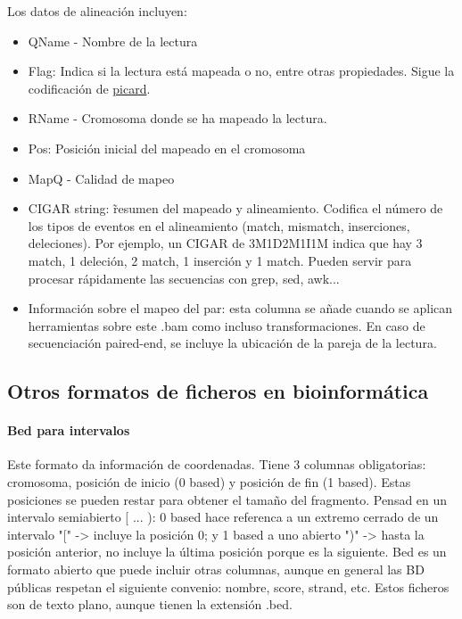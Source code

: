 Los datos de alineación incluyen: 
\begin{itemize} 
\item QName - Nombre de la lectura 
\item Flag: Indica si la lectura está mapeada o no, entre otras propiedades. Sigue la codificación de \href{https://broadinstitute.github.io/picard/explain-flags.html}{picard}.
\item RName - Cromosoma donde se ha mapeado la lectura. 
\item Pos: Posición inicial del mapeado en el cromosoma 
\item MapQ - Calidad de mapeo 
\item CIGAR string: \~ resumen del mapeado y alineamiento. Codifica el número de los tipos de eventos en el alineamiento (match, mismatch, inserciones, deleciones). Por ejemplo, un CIGAR de 3M1D2M1I1M indica que hay 3 match, 1 deleción, 2 match, 1 inserción y 1 match. Pueden servir para procesar rápidamente las secuencias con grep, sed, awk...
\item Información sobre el mapeo del par: esta columna se añade cuando se aplican herramientas sobre este .bam como incluso transformaciones. En caso de secuenciación paired-end, se incluye la ubicación de la pareja de la lectura. 
\end{itemize}

\subsection{Otros formatos de ficheros en bioinformática}
\paragraph{Bed para intervalos}
Este formato da información de coordenadas. Tiene 3 columnas obligatorias: cromosoma, posición de inicio (0 based) y posición de fin (1 based). Estas posiciones se pueden restar para obtener el tamaño del fragmento. Pensad en un intervalo semiabierto [ ... ): 0 based hace referenca a un extremo cerrado de un intervalo "[" -> incluye la posición 0; y 1 based a uno abierto ")" -> hasta la posición anterior, no incluye la última posición porque es la siguiente. Bed es un formato abierto que puede incluir otras columnas, aunque en general las BD públicas respetan el siguiente convenio: nombre, score, strand, etc. Estos ficheros son de texto plano, aunque tienen la extensión .bed. 

